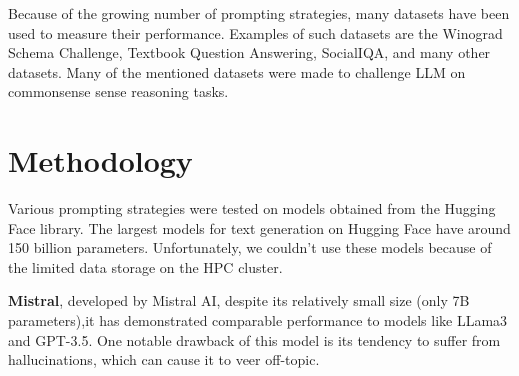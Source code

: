 \documentclass[fleqn,moreauthors,10pt]{ds_report}
\begin{document}
    Because of the growing number of prompting strategies, many datasets have been used to measure their performance. Examples of such datasets are the Winograd Schema Challenge\cite{levesque2012winograd}, Textbook Question Answering\cite{Kembhavi2017AreYS},  SocialIQA\cite{sap2019socialiqa}, and many other datasets. Many of the mentioned datasets were made to challenge LLM on commonsense sense reasoning tasks.

\section*{Methodology}

Various prompting strategies were tested on models obtained from the Hugging Face library. The largest models for text generation on Hugging Face have around 150 billion parameters. Unfortunately, we couldn't use these models because of the limited data storage on the HPC cluster.

\textbf{Mistral}, developed by Mistral AI, despite its relatively small size (only 7B parameters),it has demonstrated comparable performance to models like LLama3 and GPT-3.5. One notable drawback of this model is its tendency to suffer from hallucinations, which can cause it to veer off-topic.
\end{document}
